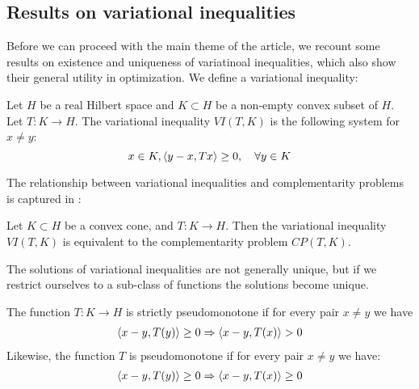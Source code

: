 \subsection{Results on variational inequalities}
Before we can proceed with the main theme of the article, we recount some results on existence and uniqueness of variatinoal inequalities, which also show their general utility in optimization.
We define a variational inequality:
\begin{definition}
  Let $H$ be a real Hilbert space and $K\subset H$ be a non-empty convex subset of $H$. Let $T: K \to H$. The variational inequality $VI(T,K)$ is the following system for $x\neq y$:
  \begin{equation}
    x \in K, \left \langle y-x,Tx \right \rangle \geq 0, \quad \forall y \in K
  \end{equation}
\end{definition}
The relationship between variational inequalities and complementarity problems is captured in \citep[Proposition 12.1]{hadjisavvas2006handbook}:
\begin{proposition}
  \label{prop:VI_CP_eq}
  Let $K\subset H$ be a convex cone, and $T: K \to H$. Then the variational inequality $VI(T,K)$ is equivalent to the complementarity problem $CP(T,K)$.
\end{proposition}
\begin{comment}
\begin{proof}
  Clearly, a solution $x^*$ to $CP(T,K)$ is also a solution to $VI(T,K)$. For the other direction, assume that we have a solution $x^*$ to VI(T,K). Then
  \begin{equation}
    \ip{y - x^*}{Tx^*} \geq 0 \forall y \in K
  \end{equation}
  Setting $y = 2x^*$, we arrive at $\ip{x^*}{T(x^*)} \geq 0$, and setting $y=0$ we arrive at $\ip{x^*}{Tx^*} \leq 0$. This shows the desired equivalence.
\end{proof}
\end{comment}
The solutions of variational inequalities are not generally unique, but if we restrict ourselves to a sub-class of functions the solutions become unique.
\begin{definition}
  \label{def:strict_pm}
 The function $T: K \to H$ is strictly pseudomonotone if for every pair $x\neq y$ we have
 \begin{align}
   \left \langle x-y,T(y) \right \rangle \geq 0 \Rightarrow \left \langle x-y,T(x) \right \rangle > 0
 \end{align}
 Likewise, the function $T$ is pseudomonotone if for every pair $x\neq y$ we have:
 \begin{align}
   \left \langle x-y,T(y) \right \rangle \geq 0 \Rightarrow \left \langle x-y,T(x) \right \rangle \geq 0
 \end{align}
\end{definition}

